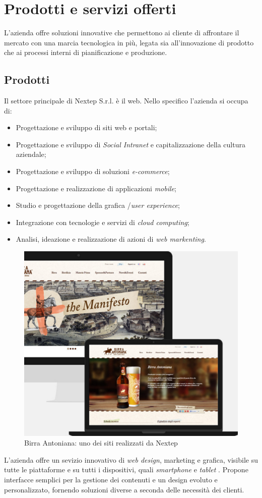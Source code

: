 \section{Prodotti e servizi offerti}

L'azienda offre soluzioni innovative che permettono ai cliente di affrontare il mercato con una marcia tecnologica in più, legata sia all'innovazione di prodotto che ai processi interni di pianificazione e produzione.

\subsection{Prodotti}

Il settore principale di Nextep S.r.l. è il web. Nello specifico l'azienda si occupa di:
\begin{itemize}
	\item Progettazione e sviluppo di siti web e portali;
	\item Progettazione e sviluppo di \textit{Social Intranet }e capitalizzazione della cultura aziendale;
	\item Progettazione e sviluppo di soluzioni \textit{e-commerce};
	\item Progettazione e realizzazione di applicazioni \textit{mobile};
	\item Studio e progettazione della grafica /\textit{user experience};
	\item Integrazione con tecnologie e servizi di \textit{cloud computing};
	\item Analisi, ideazione e realizzazione di azioni di \textit{web markenting}.
\end{itemize}

\begin{figure}[h]
\centering
\includegraphics[width=0.7\linewidth]{immagini/sito}
\caption[Birra Antoniana: uno dei siti realizzati da Nextep]{Birra Antoniana: uno dei siti realizzati da Nextep}
\label{fig:sito}
\end{figure}
L'azienda offre un sevizio innovativo di \textit{web design}, marketing e grafica, visibile su tutte le piattaforme e su tutti i dispositivi, quali \textit{smartphone} e \textit{tablet} . Propone interfacce semplici per la gestione dei contenuti e un design evoluto e personalizzato, fornendo soluzioni diverse a seconda delle necessità dei clienti.


